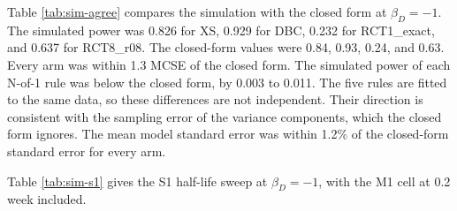 \documentclass[
  11pt,
]{article}
\begin{document}
\begin{table}[!h]
\centering
\caption{\label{tab:sim-agree}Simulation against closed form at $\beta_D = -1$ and half-life 0.2 week. The column z is the simulated minus the closed-form power, divided by the MCSE.}
\centering
{}
\end{table}

Table \ref{tab:sim-agree} compares the simulation with the closed form at \(\beta_D = -1\). The simulated power was 0.826 for XS, 0.929 for DBC, 0.232 for RCT1\_exact, and 0.637 for RCT8\_r08. The closed-form values were 0.84, 0.93, 0.24, and 0.63. Every arm was within 1.3 MCSE of the closed form. The simulated power of each N-of-1 rule was below the closed form, by 0.003 to 0.011. The five rules are fitted to the same data, so these differences are not independent. Their direction is consistent with the sampling error of the variance components, which the closed form ignores. The mean model standard error was within 1.2\% of the closed-form standard error for every arm.

Table \ref{tab:sim-s1} gives the S1 half-life sweep at \(\beta_D = -1\), with the M1 cell at 0.2 week included.
\end{document}
